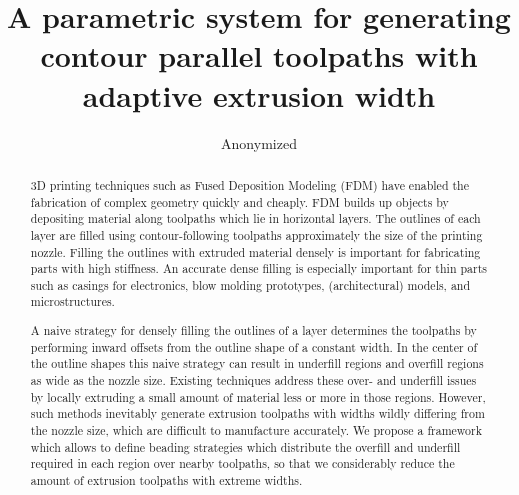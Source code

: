 \documentclass[preprint,5p,twocolumn,times]{elsarticle}
\theoremstyle{definition}
\begin{document}
\baselineskip11pt %

\begin{frontmatter} %

\title{A parametric system for generating contour parallel toolpaths with adaptive extrusion width}

\author{Anonymized}

\iffalse
\author[um,tud]{Tim Kuipers}
\author[tud]{Eugeni L. Doubrovski}
\author[tud]{Jun Wu}
\author[cuhk]{Charlie Wang{\corref{cor1}}}
\ead{cwang@mae.cuhk.edu.hk}
\cortext[cor1]{Corresponding author}
\address[um]{Ultimaker, Utrecht, The Netherlands}
\address[tud]{Department of Design Engineering, Delft University of Technology, The Netherlands}
\address[cuhk]{Department of Mechanical and Automation Engineering, The Chinese University of Hong Kong, Hong Kong SAR, China}
\fi

\begin{abstract}
3D printing techniques such as Fused Deposition Modeling (FDM) have enabled the fabrication of complex geometry quickly and cheaply. 
FDM builds up objects by depositing material along toolpaths which lie in horizontal layers.
The outlines of each layer are filled using contour-following toolpaths approximately the size of the printing nozzle.
Filling the outlines with extruded material densely is important for fabricating parts with high stiffness.
An accurate dense filling is especially important for thin parts such as casings for electronics, blow molding prototypes, (architectural) models, and microstructures.

A naive strategy for densely filling the outlines of a layer determines the toolpaths by performing inward offsets from the outline shape of a constant width.
In the center of the outline shapes this naive strategy can result in underfill regions and overfill regions as wide as the nozzle size.
Existing techniques address these over- and underfill issues by locally extruding a small amount of material less or more in those regions.
However, such methods inevitably generate extrusion toolpaths with widths wildly differing from the nozzle size, which are difficult to manufacture accurately.
We propose a framework which allows to define beading strategies which distribute the overfill and underfill required in each region over nearby toolpaths, so that we considerably reduce the amount of extrusion toolpaths with extreme widths.


\end{abstract}
\end{frontmatter}
\end{document}
